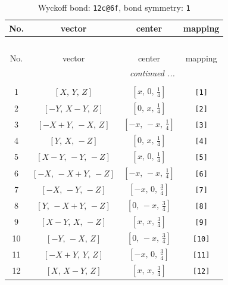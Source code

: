\documentclass[fleqn,8pt]{jsarticle}
\begin{document}
\begin{longtable}{cccc}
\caption{Wyckoff bond: {\tt 12c@6f}, bond symmetry: {\tt 1}}
 \\
 \hline \hline
No. & vector & center & mapping \\ \hline \endfirsthead

\multicolumn{3}{l}{\tablename\ \thetable{}} \\
 \hline \hline
No. & vector & center & mapping \\ \hline \endhead

 \hline \hline
\multicolumn{3}{r}{\footnotesize\it continued ...} \\ \endfoot

 \hline \hline
\multicolumn{3}{r}{} \\ \endlastfoot

1 & $\left[ X,\, Y,\, Z \right]$ & $\left[ x,\, 0,\, \frac{1}{4} \right]$ & {\tt [1]} \\ \hline
2 & $\left[ - Y,\, X - Y,\, Z \right]$ & $\left[ 0,\, x,\, \frac{1}{4} \right]$ & {\tt [2]} \\ \hline
3 & $\left[ - X + Y,\, - X,\, Z \right]$ & $\left[ - x,\, - x,\, \frac{1}{4} \right]$ & {\tt [3]} \\ \hline
4 & $\left[ Y,\, X,\, - Z \right]$ & $\left[ 0,\, x,\, \frac{1}{4} \right]$ & {\tt [4]} \\ \hline
5 & $\left[ X - Y,\, - Y,\, - Z \right]$ & $\left[ x,\, 0,\, \frac{1}{4} \right]$ & {\tt [5]} \\ \hline
6 & $\left[ - X,\, - X + Y,\, - Z \right]$ & $\left[ - x,\, - x,\, \frac{1}{4} \right]$ & {\tt [6]} \\ \hline
7 & $\left[ - X,\, - Y,\, - Z \right]$ & $\left[ - x,\, 0,\, \frac{3}{4} \right]$ & {\tt [7]} \\ \hline
8 & $\left[ Y,\, - X + Y,\, - Z \right]$ & $\left[ 0,\, - x,\, \frac{3}{4} \right]$ & {\tt [8]} \\ \hline
9 & $\left[ X - Y,\, X,\, - Z \right]$ & $\left[ x,\, x,\, \frac{3}{4} \right]$ & {\tt [9]} \\ \hline
10 & $\left[ - Y,\, - X,\, Z \right]$ & $\left[ 0,\, - x,\, \frac{3}{4} \right]$ & {\tt [10]} \\ \hline
11 & $\left[ - X + Y,\, Y,\, Z \right]$ & $\left[ - x,\, 0,\, \frac{3}{4} \right]$ & {\tt [11]} \\ \hline
12 & $\left[ X,\, X - Y,\, Z \right]$ & $\left[ x,\, x,\, \frac{3}{4} \right]$ & {\tt [12]} \\
\end{longtable}
\end{document}
